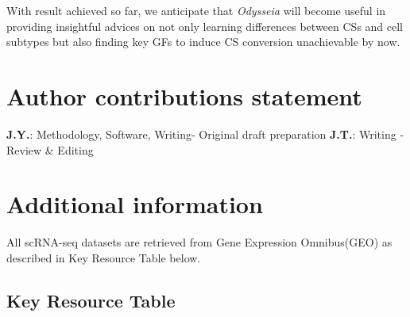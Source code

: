 \documentclass[fleqn,10pt]{wlscirep}
\begin{document}
With result achieved so far, we anticipate that \emph{Odysseia} will become useful in providing insightful advices on not only learning differences between CSs and cell subtypes but also finding key GFs to induce CS conversion unachievable by now.





\section*{Author contributions statement}
\textbf{J.Y.}: Methodology, Software, Writing- Original draft preparation
\textbf{J.T.}: Writing - Review \& Editing

\section*{Additional information}
All scRNA-seq datasets are retrieved from Gene Expression Omnibus(GEO) as described in Key Resource Table below.


\subsection*{Key Resource Table}
\end{document}
